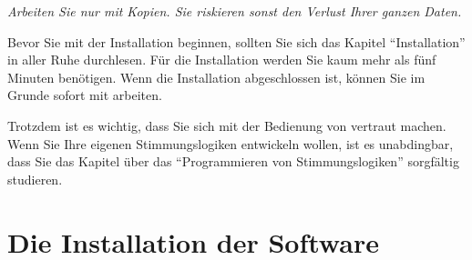 \emph{Arbeiten Sie nur mit Kopien.
Sie riskieren sonst den Verlust Ihrer ganzen Daten.}
\fi

Bevor Sie mit der Installation beginnen, sollten Sie sich das
Kapitel "`Installation"' in aller Ruhe durchlesen. Für die
Installation werden Sie kaum mehr als fünf Minuten benötigen. Wenn
die Installation abgeschlossen ist, können Sie im Grunde sofort
mit \mutabor{} arbeiten.

Trotzdem ist es wichtig, dass Sie sich mit der Bedienung von
\mutabor{} vertraut machen. Wenn Sie Ihre eigenen
Stimmungslogiken entwickeln wollen, ist es unabdingbar, dass Sie
das Kapitel über das "`Programmieren von Stimmungslogiken"'
sorgfältig studieren.


\chapter{Die Installation der Software}\label{cha:die-installation-der}


\iffalse
\section{Installation auf Diskette}\label{sec:inst-auf-disk}

Zur Installation auf Diskette fertigen Sie einfach eine Kopie der
Originaldiskette an. Zusätzlich müssen Sie einen Text-Editor auf die
Arbeitsdiskette kopieren, falls Sie eigene Logikprogramme schreiben
wollen. Sie können gegebenenfalls auch den von uns als Geschenk
beigefügten Public-Domain-Editor verwenden. Falls Sie nur fertige
Logikprogramme laufen lassen wollen, ist der Text-Editor nicht nötig.
Sie können aber auch jeden anderen Text-Editor verwenden. Achten Sie
dabei darauf, dass der Editor \textbf{keine}
Steuerzeichen\index{Steuerzeichen!keine} oder Formatierungen in die
Programmdatei schreibt, der von Ihnen erstellte Quelltext also aus
reinen ASCII-Zeichen besteht.

\section{Installation auf Festplatte}\label{sec:inst-auf-festpl}

Zur Installation auf Festplatte legen Sie einen eigenen Ordner
an, der z.\,B. \filename{MUTABOR.II} heißen kann. Kopieren Sie den
Inhalt der Originaldiskette in diesen Ordner. Ferner sollte
auf Ihrem Computer ein Text-Editor vorhanden sein. Für den
Text-Editor gilt sinngemäß dasselbe wie bei der Installation
auf Diskette.
\fi

